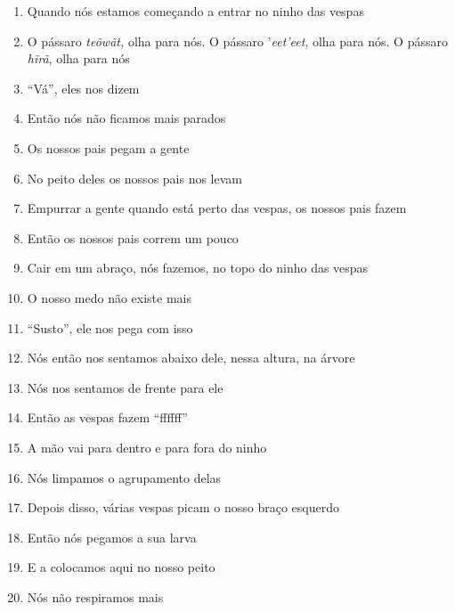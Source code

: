 \begin{enumerate}
 \begin{center}\end{center}
 
 \item Quando nós estamos começando a entrar no ninho das vespas
 \item O pássaro \textit{teõwãt,} olha para nós. O pássaro '\textit{eet'eet},
 olha para nós. O pássaro \textit{hĩrã}, olha para nós
 \item ``Vá'', eles nos dizem
 \item Então nós não ficamos mais parados
 
 \begin{center}\end{center}
 
 \item Os nossos pais pegam a gente
 \item No peito deles os nossos pais nos levam
 \item Empurrar a gente quando está perto das vespas, os nossos pais fazem
 \item Então os nossos pais correm um pouco
 
 \begin{center}\end{center}
 
 \item Cair em um abraço, nós fazemos, no topo do ninho das vespas
 \item O nosso medo não existe mais
 \item ``Susto'', ele nos pega com isso
 \item Nós então nos sentamos abaixo dele, nessa altura, na árvore
 \item Nós nos sentamos de frente para ele
 
 \begin{center}\end{center}
 
 \item Então as vespas fazem ``ffffff''
 \item A mão vai para dentro e para fora do ninho
 \item Nós limpamos o agrupamento delas
 \item Depois disso, várias vespas picam o nosso braço esquerdo
 \item Então nós pegamos a sua larva
 \item E a colocamos aqui no nosso peito
 \item Nós não respiramos mais
 

\end{enumerate}
